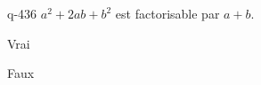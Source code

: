 \begin{truefalse}{q-436}
$a^2+2ab+b^2$ est factorisable par $a+b$.
\item* Vrai
\item Faux
\end{truefalse}

